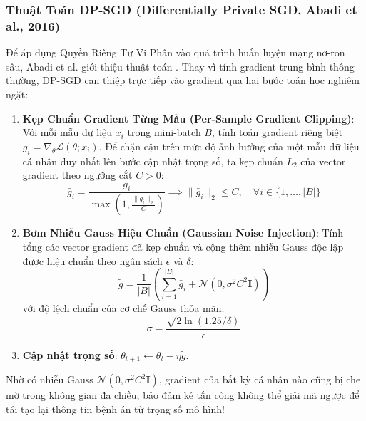 \subsubsection{Thuật Toán DP-SGD (Differentially Private SGD, Abadi et al., 2016)}
Để áp dụng Quyền Riêng Tư Vi Phân vào quá trình huấn luyện mạng nơ-ron sâu, Abadi et al. giới thiệu thuật toán . Thay vì tính gradient trung bình thông thường, DP-SGD can thiệp trực tiếp vào gradient qua hai bước toán học nghiêm ngặt:
\begin{enumerate}
  \item \textbf{Kẹp Chuẩn Gradient Từng Mẫu (Per-Sample Gradient Clipping)}:
  Với mỗi mẫu dữ liệu $x_i$ trong mini-batch $B$, tính toán gradient riêng biệt $g_i = \nabla_\theta \mathcal{L}(\theta; x_i)$. Để chặn cận trên mức độ ảnh hưởng của một mẫu dữ liệu cá nhân duy nhất lên bước cập nhật trọng số, ta kẹp chuẩn $L_2$ của vector gradient theo ngưỡng cắt $C > 0$:
  \begin{equation}
  \bar{g}_i = \frac{g_i}{\max\left(1, \frac{\|g_i\|_2}{C}\right)} \implies \|\bar{g}_i\|_2 \le C, \quad \forall i \in \{1, \dots, |B|\}
  \label{eq:per-sample-clipping}
  \end{equation}
  \item \textbf{Bơm Nhiễu Gauss Hiệu Chuẩn (Gaussian Noise Injection)}:
  Tính tổng các vector gradient đã kẹp chuẩn và cộng thêm nhiễu Gauss độc lập được hiệu chuẩn theo ngân sách $\epsilon$ và $\delta$:
  \begin{equation}
  \tilde{g} = \frac{1}{|B|} \left( \sum_{i=1}^{|B|} \bar{g}_i + \mathcal{N}\left(0, \sigma^2 C^2 \mathbf{I}\right) \right)
  \label{eq:dpsgd-noise-injection}
  \end{equation}
  với độ lệch chuẩn của cơ chế Gauss thỏa mãn:
  \begin{equation}
  \sigma = \frac{\sqrt{2 \ln(1.25 / \delta)}}{\epsilon}
  \label{eq:gaussian-mechanism-sigma}
  \end{equation}
  \item \textbf{Cập nhật trọng số}: $\theta_{t+1} \leftarrow \theta_t - \eta \tilde{g}$.
\end{enumerate}

Nhờ có nhiễu Gauss $\mathcal{N}(0, \sigma^2 C^2 \mathbf{I})$, gradient của bất kỳ cá nhân nào cũng bị che mờ trong không gian đa chiều, bảo đảm kẻ tấn công không thể giải mã ngược để tái tạo lại thông tin bệnh án từ trọng số mô hình!

